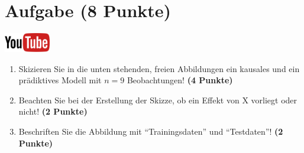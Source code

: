 \documentclass[a4paper, 10pt]{scrartcl}\usepackage[]{graphicx}\usepackage[]{xcolor}
\begin{document}
\clearpage

\section{Aufgabe \hfill (8 Punkte)}

\hfill\href{https://youtu.be/C_a8aOMI7GE}{\includegraphics[width =
  2cm]{img/youtube}}\\[1Ex]



\begin{enumerate}
\item Skizieren Sie in die unten stehenden, freien Abbildungen ein kausales
  und ein pr{\"a}diktives Modell mit $n = 9$
  Beobachtungen! \textbf{(4 Punkte)}
\item Beachten Sie bei der Erstellung der Skizze, ob ein Effekt von X
  vorliegt oder nicht! \textbf{(2 Punkte)}
\item Beschriften Sie die Abbildung mit "`Trainingsdaten"' und "`Testdaten"'!  \textbf{(2 Punkte)}
\end{enumerate}
\end{document}
